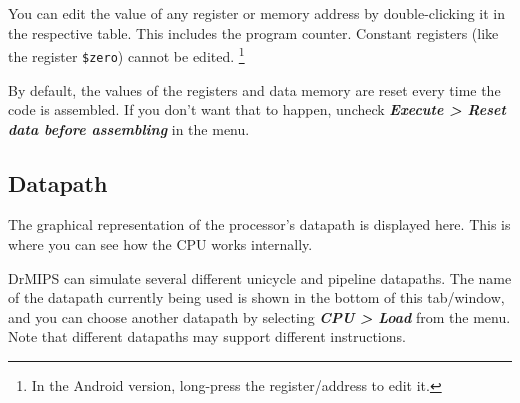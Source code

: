 \documentclass[11pt,a4paper,twoside,titlepage]{article}
\newcommand{\menupath}[1]{\textbf{\emph{#1}}}
\begin{document}
You can edit the value of any register or memory address by double-clicking
it in the respective table. This includes the program counter.
Constant registers (like the register \verb+$zero+) cannot be edited.
\footnote{In the Android version, long-press the register/address to edit it.}

By default, the values of the registers and data memory are reset every time
the code is assembled.
If you don't want that to happen, uncheck 
\menupath{Execute > Reset data before assembling} in the menu.


\subsection{Datapath}

The graphical representation of the processor's datapath is displayed here.
This is where you can see how the CPU works internally.

DrMIPS can simulate several different unicycle and pipeline datapaths.
The name of the datapath currently being used is shown in the bottom of this
tab/window, and you can choose another datapath by selecting 
\menupath{CPU > Load} from the menu.
Note that different datapaths may support different instructions.
\end{document}
